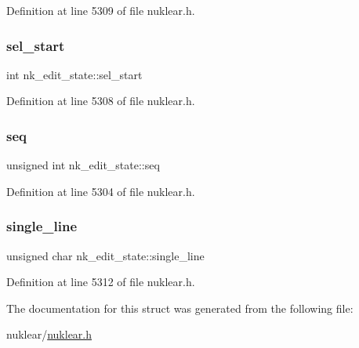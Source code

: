 Definition at line 5309 of file nuklear.\+h.

\mbox{\label{structnk__edit__state_aeecc32de6d1be464baa562d9bba3a351}} 
\subsubsection{\texorpdfstring{sel\+\_\+start}{sel\_start}}
{\footnotesize\ttfamily int nk\+\_\+edit\+\_\+state\+::sel\+\_\+start}



Definition at line 5308 of file nuklear.\+h.

\mbox{\label{structnk__edit__state_a1c65e389e43214b89c65214a859e883f}} 
\subsubsection{\texorpdfstring{seq}{seq}}
{\footnotesize\ttfamily unsigned int nk\+\_\+edit\+\_\+state\+::seq}



Definition at line 5304 of file nuklear.\+h.

\mbox{\label{structnk__edit__state_ab124091270e7af08f6df9410a647ae1c}} 
\subsubsection{\texorpdfstring{single\+\_\+line}{single\_line}}
{\footnotesize\ttfamily unsigned char nk\+\_\+edit\+\_\+state\+::single\+\_\+line}



Definition at line 5312 of file nuklear.\+h.



The documentation for this struct was generated from the following file\+:\begin{DoxyCompactItemize}
\item 
nuklear/\mbox{\hyperlink{nuklear_8h}{nuklear.\+h}}\end{DoxyCompactItemize}
